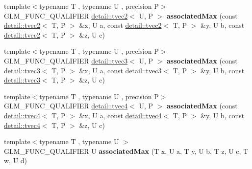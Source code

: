 \begin{DoxyCompactItemize}
\item 
{\footnotesize template$<$typename T , typename U , precision P$>$ }\\G\+L\+M\+\_\+\+F\+U\+N\+C\+\_\+\+Q\+U\+A\+L\+I\+F\+I\+ER \hyperlink{structglm_1_1detail_1_1tvec2}{detail\+::tvec2}$<$ U, P $>$ {\bfseries associated\+Max} (const \hyperlink{structglm_1_1detail_1_1tvec2}{detail\+::tvec2}$<$ T, P $>$ \&x, U a, const \hyperlink{structglm_1_1detail_1_1tvec2}{detail\+::tvec2}$<$ T, P $>$ \&y, U b, const \hyperlink{structglm_1_1detail_1_1tvec2}{detail\+::tvec2}$<$ T, P $>$ \&z, U c)\hypertarget{namespaceglm_a1bff89aba9a245cf4976d6b7fb66ddd8}{}\label{namespaceglm_a1bff89aba9a245cf4976d6b7fb66ddd8}

\item 
{\footnotesize template$<$typename T , typename U , precision P$>$ }\\G\+L\+M\+\_\+\+F\+U\+N\+C\+\_\+\+Q\+U\+A\+L\+I\+F\+I\+ER \hyperlink{structglm_1_1detail_1_1tvec3}{detail\+::tvec3}$<$ U, P $>$ {\bfseries associated\+Max} (const \hyperlink{structglm_1_1detail_1_1tvec3}{detail\+::tvec3}$<$ T, P $>$ \&x, U a, const \hyperlink{structglm_1_1detail_1_1tvec3}{detail\+::tvec3}$<$ T, P $>$ \&y, U b, const \hyperlink{structglm_1_1detail_1_1tvec3}{detail\+::tvec3}$<$ T, P $>$ \&z, U c)\hypertarget{namespaceglm_a95d56ed7aac4ce11096a2dd02b1ee085}{}\label{namespaceglm_a95d56ed7aac4ce11096a2dd02b1ee085}

\item 
{\footnotesize template$<$typename T , typename U , precision P$>$ }\\G\+L\+M\+\_\+\+F\+U\+N\+C\+\_\+\+Q\+U\+A\+L\+I\+F\+I\+ER \hyperlink{structglm_1_1detail_1_1tvec4}{detail\+::tvec4}$<$ U, P $>$ {\bfseries associated\+Max} (const \hyperlink{structglm_1_1detail_1_1tvec4}{detail\+::tvec4}$<$ T, P $>$ \&x, U a, const \hyperlink{structglm_1_1detail_1_1tvec4}{detail\+::tvec4}$<$ T, P $>$ \&y, U b, const \hyperlink{structglm_1_1detail_1_1tvec4}{detail\+::tvec4}$<$ T, P $>$ \&z, U c)\hypertarget{namespaceglm_a7ccec1a3ebac248a4fc02c0cd62e455a}{}\label{namespaceglm_a7ccec1a3ebac248a4fc02c0cd62e455a}

\item 
{\footnotesize template$<$typename T , typename U $>$ }\\G\+L\+M\+\_\+\+F\+U\+N\+C\+\_\+\+Q\+U\+A\+L\+I\+F\+I\+ER U {\bfseries associated\+Max} (T x, U a, T y, U b, T z, U c, T w, U d)\hypertarget{namespaceglm_a7ec2c4ed91faef109efef1465ca65ca4}{}\label{namespaceglm_a7ec2c4ed91faef109efef1465ca65ca4}


\end{DoxyCompactItemize}
